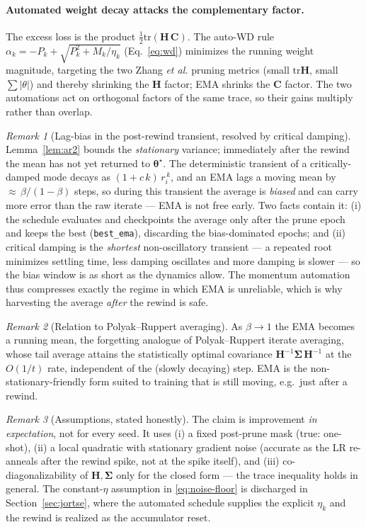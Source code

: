 \documentclass[11pt]{article}
\theoremstyle{remark}
\newtheorem{remark}{Remark}
\newcommand{\tr}{\mathrm{tr}}
\newcommand{\Hess}{\bm{H}}
\newcommand{\Sig}{\bm{\Sigma}}
\begin{document}
\paragraph{Automated weight decay attacks the complementary factor.}
The excess loss is the product $\tfrac12\tr(\Hess\,\bm C)$. The auto-WD rule
$\alpha_k=-P_k+\sqrt{P_k^2+M_k/\eta_k}$ (Eq.~\eqref{eq:wd}) minimizes the running
weight magnitude, targeting the two Zhang \emph{et al.} pruning metrics (small
$\tr\Hess$, small $\sum|\theta|$) and thereby shrinking the $\Hess$ factor; EMA
shrinks the $\bm C$ factor. The two automations act on orthogonal factors of the
same trace, so their gains multiply rather than overlap.

\begin{remark}[Lag-bias in the post-rewind transient, resolved by critical damping]
Lemma~\ref{lem:ar2} bounds the \emph{stationary} variance; immediately after the
rewind the mean has not yet returned to $\bm\theta^\star$. The deterministic
transient of a critically-damped mode decays as $(1+c\,k)\,r_i^{\,k}$, and an EMA
lags a moving mean by ${\approx}\,\beta/(1-\beta)$ steps, so during this transient
the average is \emph{biased} and can carry more error than the raw iterate --- EMA
is not free early. Two facts contain it: (i) the schedule evaluates and checkpoints
the average only after the prune epoch and keeps the best (\texttt{best\_ema}),
discarding the bias-dominated epochs; and (ii) critical damping is the
\emph{shortest} non-oscillatory transient --- a repeated root minimizes settling
time, less damping oscillates and more damping is slower --- so the bias window is
as short as the dynamics allow. The momentum automation thus compresses exactly the
regime in which EMA is unreliable, which is why harvesting the average \emph{after}
the rewind is safe.
\end{remark}

\begin{remark}[Relation to Polyak--Ruppert averaging]
As $\beta\to1$ the EMA becomes a running mean, the forgetting analogue of
Polyak--Ruppert iterate averaging, whose tail average attains the statistically
optimal covariance $\Hess^{-1}\Sig\,\Hess^{-1}$ at the $O(1/t)$ rate,
independent of the (slowly decaying) step. EMA is the non-stationary-friendly
form suited to training that is still moving, e.g.\ just after a rewind.
\end{remark}

\begin{remark}[Assumptions, stated honestly]
The claim is improvement \emph{in expectation}, not for every seed. It uses
(i) a fixed post-prune mask (true: one-shot), (ii) a local quadratic with
stationary gradient noise (accurate as the LR re-anneals after the rewind
spike, not at the spike itself), and (iii) co-diagonalizability of $\Hess,\Sig$
only for the closed form --- the trace inequality holds in general. The
constant-$\eta$ assumption in \eqref{eq:noise-floor} is discharged in
Section~\ref{sec:jortse}, where the automated schedule supplies the explicit
$\eta_k$ and the rewind is realized as the accumulator reset.
\end{remark}
\end{document}
